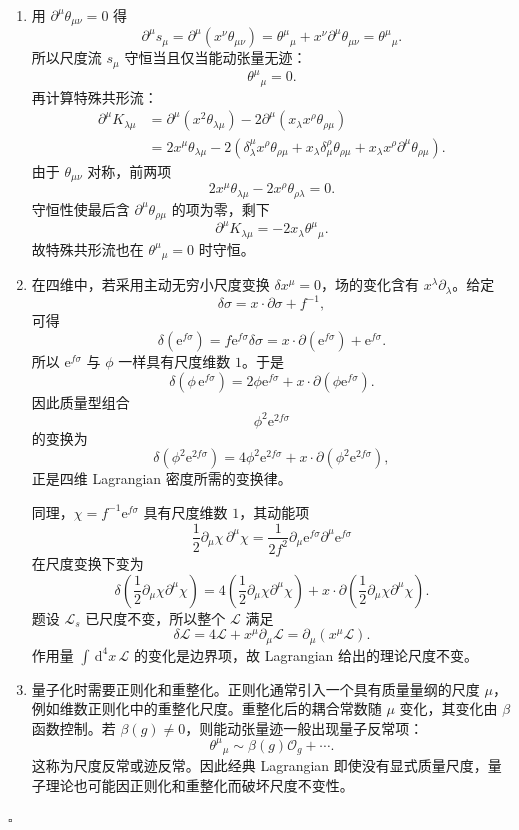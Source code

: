 \documentclass[UTF8,12pt]{ctexart}
\newcommand{\dd}{\,\mathrm d}
\newcommand{\ee}{\mathrm e}
\newenvironment{solution}{%
  \par\medskip
  \noindent{\bfseries 解答}\quad\ignorespaces
}{\hfill$\square$\par\medskip}
\begin{document}
\begin{solution}
\begin{enumerate}[label=(\alph*)]
\item 用 \(\partial^\mu\theta_{\mu\nu}=0\) 得
\[
\partial^\mu s_\mu
=\partial^\mu(x^\nu\theta_{\mu\nu})
=\theta^\mu{}_\mu+x^\nu\partial^\mu\theta_{\mu\nu}
=\theta^\mu{}_\mu.
\]
所以尺度流 \(s_\mu\) 守恒当且仅当能动张量无迹：
\[
\theta^\mu{}_\mu=0.
\]
再计算特殊共形流：
\[
\begin{aligned}
\partial^\mu K_{\lambda\mu}
&=\partial^\mu(x^2\theta_{\lambda\mu})
-2\partial^\mu(x_\lambda x^\rho\theta_{\rho\mu})\\
&=2x^\mu\theta_{\lambda\mu}
-2\left(\delta^\mu_\lambda x^\rho\theta_{\rho\mu}
+x_\lambda\delta^\rho_\mu\theta_{\rho\mu}
+x_\lambda x^\rho\partial^\mu\theta_{\rho\mu}\right).
\end{aligned}
\]
由于 \(\theta_{\mu\nu}\) 对称，前两项
\[
2x^\mu\theta_{\lambda\mu}-2x^\rho\theta_{\rho\lambda}=0.
\]
守恒性使最后含 \(\partial^\mu\theta_{\rho\mu}\) 的项为零，剩下
\[
\partial^\mu K_{\lambda\mu}=-2x_\lambda\theta^\mu{}_\mu.
\]
故特殊共形流也在 \(\theta^\mu{}_\mu=0\) 时守恒。

\item 在四维中，若采用主动无穷小尺度变换 \(\delta x^\mu=0\)，场的变化含有 \(x^\lambda\partial_\lambda\)。给定
\[
\delta\sigma=x\cdot\partial\sigma+f^{-1},
\]
可得
\[
\delta(\ee^{f\sigma})
=f\ee^{f\sigma}\delta\sigma
=x\cdot\partial(\ee^{f\sigma})+\ee^{f\sigma}.
\]
所以 \(\ee^{f\sigma}\) 与 \(\phi\) 一样具有尺度维数 \(1\)。于是
\[
\delta(\phi\,\ee^{f\sigma})
=2\phi\ee^{f\sigma}+x\cdot\partial(\phi\ee^{f\sigma}).
\]
因此质量型组合
\[
\phi^2\ee^{2f\sigma}
\]
的变换为
\[
\delta(\phi^2\ee^{2f\sigma})
=4\phi^2\ee^{2f\sigma}
+x\cdot\partial(\phi^2\ee^{2f\sigma}),
\]
正是四维 Lagrangian 密度所需的变换律。

同理，\(\chi=f^{-1}\ee^{f\sigma}\) 具有尺度维数 \(1\)，其动能项
\[
\frac12\partial_\mu\chi\,\partial^\mu\chi
=\frac{1}{2f^2}\partial_\mu\ee^{f\sigma}\partial^\mu\ee^{f\sigma}
\]
在尺度变换下变为
\[
\delta\left(\frac12\partial_\mu\chi\partial^\mu\chi\right)
=4\left(\frac12\partial_\mu\chi\partial^\mu\chi\right)
+x\cdot\partial\left(\frac12\partial_\mu\chi\partial^\mu\chi\right).
\]
题设 \(\mathcal L_s\) 已尺度不变，所以整个 \(\mathcal L\) 满足
\[
\delta\mathcal L=4\mathcal L+x^\mu\partial_\mu\mathcal L
=\partial_\mu(x^\mu\mathcal L).
\]
作用量 \(\int \dd^4x\,\mathcal L\) 的变化是边界项，故 Lagrangian 给出的理论尺度不变。

\item 量子化时需要正则化和重整化。正则化通常引入一个具有质量量纲的尺度 \(\mu\)，例如维数正则化中的重整化尺度。重整化后的耦合常数随 \(\mu\) 变化，其变化由 \(\beta\) 函数控制。若 \(\beta(g)\ne0\)，则能动张量迹一般出现量子反常项：
\[
\theta^\mu{}_\mu\sim \beta(g)\mathcal O_g+\cdots.
\]
这称为尺度反常或迹反常。因此经典 Lagrangian 即使没有显式质量尺度，量子理论也可能因正则化和重整化而破坏尺度不变性。
\end{enumerate}
\end{solution}
\end{document}
